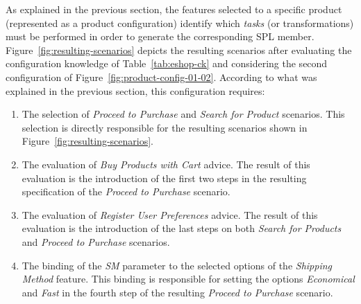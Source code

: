 \documentclass{acm_proc_article-sp}
\begin{document}
{\color{red} As explained in the previous section, the features selected to a specific product
(represented as a product configuration) identify which \emph{tasks} (or
transformations) must be performed in order to generate the corresponding SPL
member. 
Figure~\ref{fig:resulting-scenarios} depicts the resulting scenarios after evaluating the configuration knowledge of
Table~\ref{tab:eshop-ck} and considering the second configuration of
Figure~\ref{fig:product-config-01-02}. According to what was explained in the
previous section, this configuration requires: 

\begin{enumerate} 
 \item The selection of \emph{Proceed to Purchase} and \emph{Search for Product} scenarios. This selection is directly responsible 
for the resulting scenarios shown in Figure~\ref{fig:resulting-scenarios}. 
  
 \item The evaluation of \emph{Buy Products with Cart} advice. The result of this evaluation is the introduction of the 
first two steps in the resulting specification of the \emph{Proceed to Purchase} scenario. 
 
 \item The evaluation of \emph{Register User Preferences} advice. The result of this evaluation is the introduction of the last steps 
{\color{blue}on} both \emph{Search for Products} and \emph{Proceed to
Purchase} scenarios.

 \item The binding of the \emph{SM} parameter to the selected options of the \emph{Shipping Method} feature. This binding is responsible for 
 setting the options \emph{Economical} and \emph{Fast} in the fourth step of the
 resulting \emph{Proceed to Purchase} scenario.

\end{enumerate}
}
 
\end{document}
